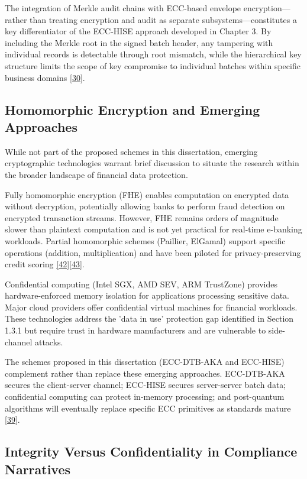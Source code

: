 \indent The integration of Merkle audit chains with ECC-based envelope encryption---rather than treating encryption and audit as separate subsystems---constitutes a key differentiator of the ECC-HISE approach developed in Chapter 3. By including the Merkle root in the signed batch header, any tampering with individual records is detectable through root mismatch, while the hierarchical key structure limits the scope of key compromise to individual batches within specific business domains \hyperref[ref:30]{[30]}.

\subsection{Homomorphic Encryption and Emerging Approaches}

\indent While not part of the proposed schemes in this dissertation, emerging cryptographic technologies warrant brief discussion to situate the research within the broader landscape of financial data protection.

\indent Fully homomorphic encryption (FHE) enables computation on encrypted data without decryption, potentially allowing banks to perform fraud detection on encrypted transaction streams. However, FHE remains orders of magnitude slower than plaintext computation and is not yet practical for real-time e-banking workloads. Partial homomorphic schemes (Paillier, ElGamal) support specific operations (addition, multiplication) and have been piloted for privacy-preserving credit scoring \hyperref[ref:42]{[42]}\hyperref[ref:43]{[43]}.

\indent Confidential computing (Intel SGX, AMD SEV, ARM TrustZone) provides hardware-enforced memory isolation for applications processing sensitive data. Major cloud providers offer confidential virtual machines for financial workloads. These technologies address the 'data in use' protection gap identified in Section 1.3.1 but require trust in hardware manufacturers and are vulnerable to side-channel attacks.

\indent The schemes proposed in this dissertation (ECC-DTB-AKA and ECC-HISE) complement rather than replace these emerging approaches. ECC-DTB-AKA secures the client-server channel; ECC-HISE secures server-server batch data; confidential computing can protect in-memory processing; and post-quantum algorithms will eventually replace specific ECC primitives as standards mature \hyperref[ref:39]{[39]}.

\subsection{Integrity Versus Confidentiality in Compliance Narratives}

